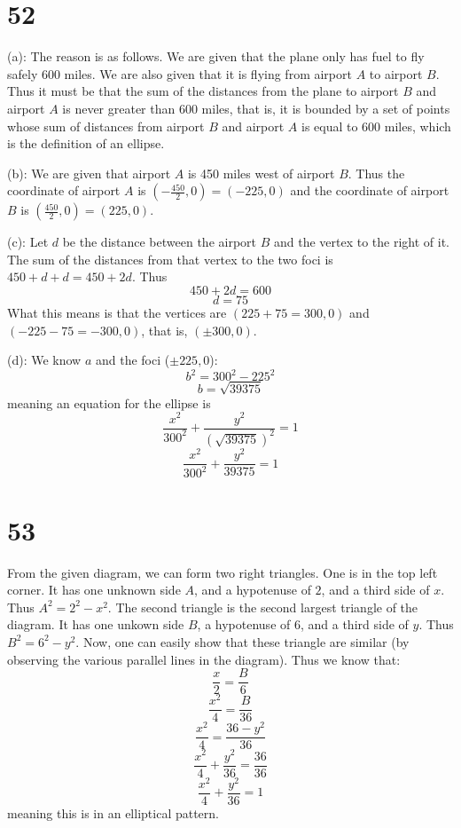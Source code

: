 \documentclass{article}
\theoremstyle{definition}
\newcommand{\?}{\stackrel{?}{=}}
\begin{document}
\section*{52}
(a): The reason is as follows. We are given that the plane only has fuel to fly safely 600 miles. We are also given that it is flying from airport $A$ to airport $B$. Thus it 
must be that the sum of the distances from the plane to airport $B$ and airport $A$ is never greater than 600 miles, 
that is, it is bounded by a set of points whose sum of distances from airport $B$ and airport $A$ is equal to 600 miles, which is the definition of an ellipse.


(b): We are given that airport $A$ is 450 miles west of airport $B$. Thus the coordinate of airport $A$ is $(-\frac{450}{2},0)=(-225,0)$ and the coordinate of airport $B$ is 
$(\frac{450}{2},0)=(225,0)$.


(c): Let $d$ be the distance between the airport $B$ and the vertex to the right of it. 
The sum of the distances from that vertex to the two foci is $450+d+d=450+2d$.
Thus \[ 450+2d=600 \] \[ d=75 \] What this means is that the vertices are 
$(225+75=300,0)$ and $(-225-75=-300,0)$, that is, $(\pm 300,0)$.


(d): We know $a$ and the foci ($\pm 225,0$):
\[ b^2=300^2-225^2 \] \[ b=\sqrt{39375} \] meaning an equation for the ellipse is \[ \frac{x^2}{300^2}+\frac{y^2}{(\sqrt{39375})^2}=1 \]
\[ \frac{x^2}{300^2}+\frac{y^2}{39375}=1 \]

\section*{53}
From the given diagram, we can form two right triangles. One is in the top left corner. It has one unknown side $A$, and a hypotenuse of $2$, and a third 
side of $x$. Thus $A^2=2^2-x^2$. The second triangle is the second largest triangle of the diagram. It has one unkown side $B$, a hypotenuse of $6$, and a third side of 
$y$. Thus $B^2=6^2-y^2$. Now, one can easily show that these triangle are similar (by observing the various parallel lines in the diagram). Thus we know that:
\[ \frac{x}{2}=\frac{B}{6} \]
\[ \frac{x^2}{4}=\frac{B}{36} \]
\[ \frac{x^2}{4}=\frac{36-y^2}{36} \]
\[ \frac{x^2}{4}+\frac{y^2}{36}=\frac{36}{36} \]
\[ \frac{x^2}{4}+\frac{y^2}{36}=1 \]
meaning this is in an elliptical pattern. 
\end{document}
